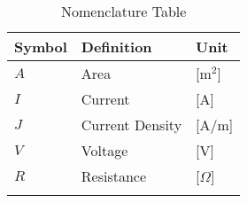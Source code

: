 \section*{}
\begin{longtable}{|p{2.5cm}|p{8cm}|p{2.5cm}|}
    \hline
    \hline
    Symbol      & Definition        & Unit \\
    \hline
    \hline
    $A$         & Area              & [m$^2$] \\
    $I$         & Current           & [A] \\
    $J$         & Current Density   & [A/m] \\
    $V$         & Voltage           & [V] \\
    $R$         & Resistance        & [$\Omega$] \\
    \hline
    \hline
    \caption{Nomenclature Table}
\end{longtable}
